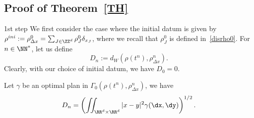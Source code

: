\subsection{Proof of Theorem~\ref{TH}}

\begin{step}{1st step}
We first consider the case where the initial datum is given by $\rho^{ini}:=\rho_{\Delta x}^0 = \sum_{J\in\ZZ^d} \rho_J^0 \delta_{x_J}$, where we recall that $\rho_J^0$ is defined in~\eqref{disrho0}. For $n\in\NN^*$, let us define
\[
D_n:= d_W (\rho(t^n),\rho_{\Delta x}^n ).
\]
Clearly, with our choice of initial datum, we have $D_0=0$.

Let $\gamma$ be an optimal plan in $\Gamma_0(\rho(t^n),\rho_{\Delta x}^n)$, we have
\[
D_n = \left(\iint_{\RR^d\times\RR^d} |x-y|^2 \gamma(\dx,\dy)\right)^{1/2}.
\]


\end{step}
